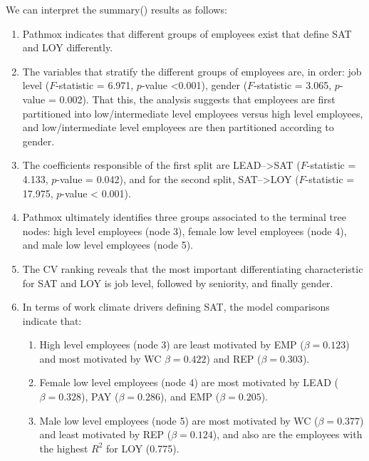 We can interpret the summary() results as follows:

\begin{enumerate}
\def\labelenumi{\arabic{enumi}.}
\item
  Pathmox indicates that different groups of employees exist that
  define SAT and LOY differently.
\item
  The variables that stratify the different groups of employees are,
  in order: job level (\(F\)-statistic = 6.971, \(p\)-value \textless0.001),
  gender (\(F\)-statistic = 3.065, \(p\)-value = 0.002). That this, the
  analysis suggests that employees are first partitioned into
  low/intermediate level employees versus high level employees, and
  low/intermediate level employees are then partitioned according to
  gender.
\item
  The coefficients responsible of the first split are LEAD--\textgreater SAT
  (\(F\)-statistic = 4.133, \(p\)-value = 0.042), and for the second
  split, SAT--\textgreater LOY (\(F\)-statistic = 17.975, \(p\)-value \textless{} 0.001).
\item
  Pathmox ultimately identifies three groups associated to the
  terminal tree nodes: high level employees (node 3), female low level
  employees (node 4), and male low level employees (node 5).
\item
  The CV ranking reveals that the most important differentiating
  characteristic for SAT and LOY is job level, followed by seniority,
  and finally gender.
\item
  In terms of work climate drivers defining SAT, the model comparisons
  indicate that:

  \begin{enumerate}
  \def\labelenumii{\arabic{enumii}.}
  \item
    High level employees (node 3) are least motivated by EMP
    (\(\beta = 0.123\)) and most motivated by WC \(\beta = 0.422\)) and
    REP (\(\beta = 0.303\)).
  \item
    Female low level employees (node 4) are most motivated by LEAD
    (\(\beta = 0.328\)), PAY (\(\beta = 0.286\)), and EMP
    (\(\beta = 0.205\)).
  \item
    Male low level employees (node 5) are most motivated by WC
    (\(\beta = 0.377\)) and least motivated by REP (\(\beta = 0.124\)),
    and also are the employees with the highest \(R^2\) for LOY
    (0.775).
  \end{enumerate}
\end{enumerate}

